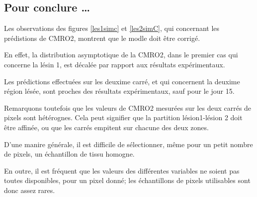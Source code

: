 \subsection{Pour conclure \dots}

Les observations des figures \ref{les1simc} et \ref{les2simC}, qui concernant les pr\'edistions de CMRO2, %
montrent que le modle doit \^etre corrig\'e.

\par
En effet, la distribution asymptotique de la CMRO2, dans le premier cas qui concerne la l\'esin 1, %
est d\'ecal\'ee par rapport aux r\'esultats exp\'erimentaux.

\par
Les pr\'edictions effectu\'ees sur les deuxime carr\'e, et qui concernent la deuxime r\'egion l\'es\'ee, %
sont proches des r\'esultats exp\'erimentaux, sauf pour le jour 15.

\etoile
Remarquons toutefois que les valeurs de CMRO2 mesur\'ees sur les deux carr\'es de pixels sont h\'et\'erognes. %
Cela peut signifier que la partition \og{} l\'esion1-l\'esion 2\fg{} doit \^etre affin\'ee, %
ou que les carr\'es empitent sur chacune des deux zones.

\par
D'une manire g\'en\'erale, il est difficile de s\'electionner, m\^eme pour un petit nombre de pixels, %
un \'echantillon de tissu homogne.

\par
En outre, il est fr\'equent que les valeurs des diff\'erentes variables ne soient pas toutes disponibles, pour un pixel donn\'e; %
les \'echantillons de pixels utilisables sont donc assez rares.

